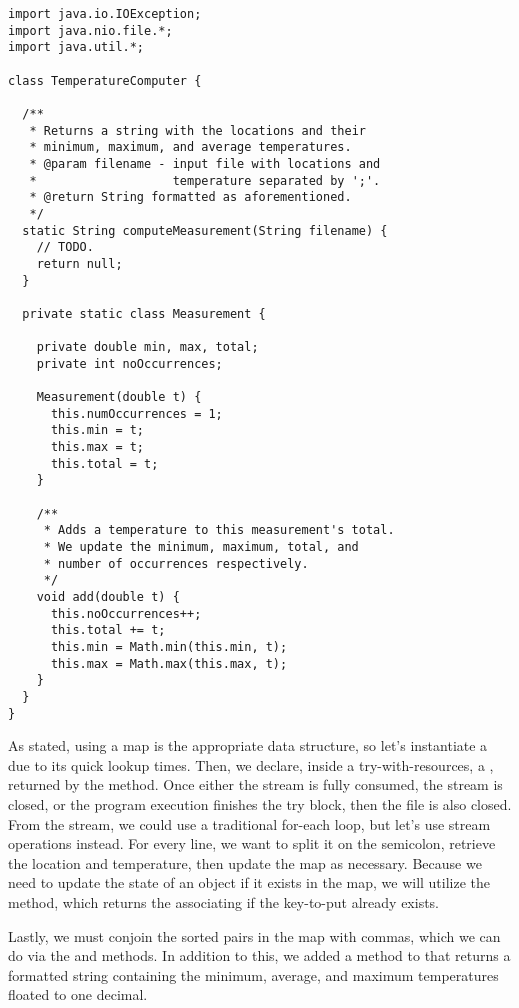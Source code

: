 \begin{lstlisting}[language=MyJava]
import java.io.IOException;
import java.nio.file.*;
import java.util.*;

class TemperatureComputer {
  
  /**
   * Returns a string with the locations and their 
   * minimum, maximum, and average temperatures.
   * @param filename - input file with locations and 
   *                   temperature separated by ';'.
   * @return String formatted as aforementioned.
   */
  static String computeMeasurement(String filename) {
    // TODO.
    return null;
  }

  private static class Measurement {
  
    private double min, max, total;
    private int noOccurrences;

    Measurement(double t) {
      this.numOccurrences = 1;
      this.min = t;
      this.max = t;
      this.total = t;
    }

    /**
     * Adds a temperature to this measurement's total.
     * We update the minimum, maximum, total, and 
     * number of occurrences respectively.
     */
    void add(double t) {
      this.noOccurrences++;
      this.total += t;
      this.min = Math.min(this.min, t);
      this.max = Math.max(this.max, t);
    }
  }
}
\end{lstlisting}

As stated, using a map is the appropriate data structure, so let's instantiate a  due to its quick lookup times. 
Then, we declare, inside a try-with-resources, a , returned by the  method. 
Once either the stream is fully consumed, the stream is closed, or the program execution finishes the try block, then the file is also closed. 
From the stream, we could use a traditional for-each loop, but let's use stream operations instead. 
For every line, we want to split it on the semicolon, retrieve the location and temperature, then update the map as necessary. 
Because we need to update the state of an object if it exists in the map, we will utilize the  method, which returns the associating  if the key-to-put already exists.

Lastly, we must conjoin the sorted pairs in the map with commas, which we can do via the  and  methods. 
In addition to this, we added a  method to  that returns a formatted string containing the minimum, average, and maximum temperatures floated to one decimal.

